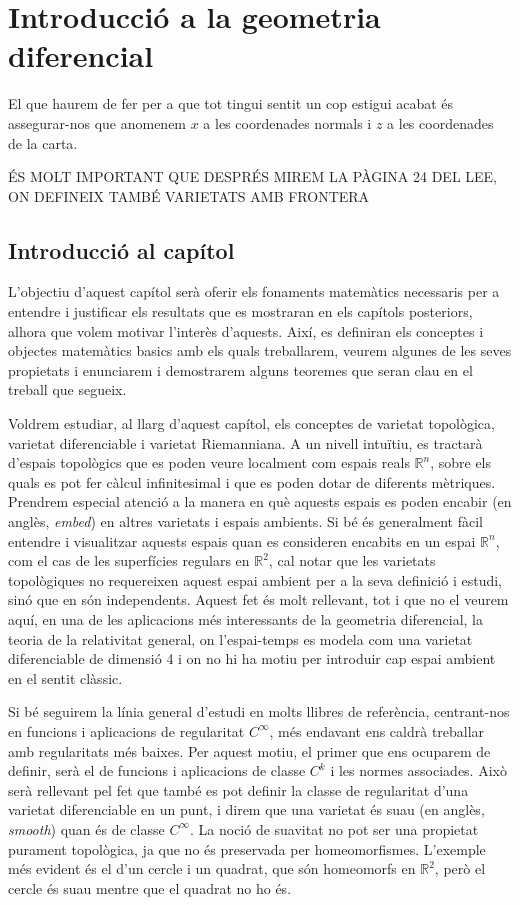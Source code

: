\chapter{Introducció a la geometria diferencial}

{\color{red} El que haurem de fer per a que tot tingui sentit un cop estigui acabat és assegurar-nos que anomenem $x$ a les coordenades normals i $z$ a les coordenades de la carta.}

{\color{red} ÉS MOLT IMPORTANT QUE DESPRÉS MIREM LA PÀGINA 24 DEL LEE, ON DEFINEIX TAMBÉ VARIETATS AMB FRONTERA}

\section{Introducció al capítol}
L'objectiu d'aquest capítol serà oferir els fonaments matemàtics necessaris per a entendre i justificar els resultats que es mostraran en els capítols posteriors, alhora que volem motivar l'interès d'aquests. Així, es definiran els conceptes i objectes matemàtics basics amb els quals treballarem, veurem algunes de les seves propietats i enunciarem i demostrarem alguns teoremes que seran clau en el treball que segueix.

Voldrem estudiar, al llarg d'aquest capítol, els conceptes de varietat topològica, varietat diferenciable i varietat Riemanniana. A un nivell intuïtiu, es tractarà d'espais topològics que es poden veure localment com espais reals $\mathbb R^n$, sobre els quals es pot fer càlcul infinitesimal i que es poden dotar de diferents mètriques. Prendrem especial atenció a la manera en què aquests espais es poden encabir (en anglès, \textit{embed}) en altres varietats i espais ambients. Si bé és generalment fàcil entendre i visualitzar aquests espais quan es consideren encabits en un espai $\mathbb R^n$, com el cas de les superfícies regulars en $\mathbb R^2$, cal notar que les varietats topològiques no requereixen aquest espai ambient per a la seva definició i estudi, sinó que en són independents. Aquest fet és molt rellevant, tot i que no el veurem aquí, en una de les aplicacions més interessants de la geometria diferencial, la teoria de la relativitat general, on l'espai-temps es modela com una varietat diferenciable de dimensió 4 i on no hi ha motiu per introduir cap espai ambient en el sentit clàssic.

Si bé seguirem la línia general d'estudi en molts llibres de referència, centrant-nos en funcions i aplicacions de regularitat $C^\infty$, més endavant ens caldrà treballar amb regularitats més baixes. Per aquest motiu, el primer que ens ocuparem de definir, serà el de funcions i aplicacions de classe $C^k$ i les normes associades. Això serà rellevant pel fet que també es pot definir la classe de regularitat d'una varietat diferenciable en un punt, i direm que una varietat és suau (en anglès, \textit{smooth}) quan és de classe $C^\infty$. La noció de suavitat no pot ser una propietat purament topològica, ja que no és preservada per homeomorfismes. L'exemple més evident és el d'un cercle i un quadrat, que són homeomorfs en $\mathbb R^2$, però el cercle és suau mentre que el quadrat no ho és. 

